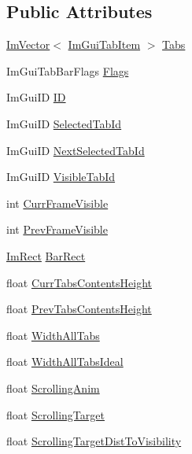 \subsection*{Public Attributes}
\begin{DoxyCompactItemize}
\item 
\hyperlink{structImVector}{Im\+Vector}$<$ \hyperlink{structImGuiTabItem}{Im\+Gui\+Tab\+Item} $>$ \hyperlink{structImGuiTabBar_a4d6d0ae42c1189fcdcec50c1e1e9b057}{Tabs}
\item 
Im\+Gui\+Tab\+Bar\+Flags \hyperlink{structImGuiTabBar_aa528c4c6a2b733caf8f4d83828077d87}{Flags}
\item 
Im\+Gui\+ID \hyperlink{structImGuiTabBar_a05b16eabc366d306e18d433ae9a741cc}{ID}
\item 
Im\+Gui\+ID \hyperlink{structImGuiTabBar_a42fa6a88e4533103420edf6095d6c2aa}{Selected\+Tab\+Id}
\item 
Im\+Gui\+ID \hyperlink{structImGuiTabBar_aba7b1f0157f85df2acc09bc107d6dfa0}{Next\+Selected\+Tab\+Id}
\item 
Im\+Gui\+ID \hyperlink{structImGuiTabBar_a1716495ecb746feb37f0b736edb50c89}{Visible\+Tab\+Id}
\item 
int \hyperlink{structImGuiTabBar_a78e5cbb7a8a793e964397f85fca07432}{Curr\+Frame\+Visible}
\item 
int \hyperlink{structImGuiTabBar_ac95b0b476d7545e74adc6a6472dc1f14}{Prev\+Frame\+Visible}
\item 
\hyperlink{structImRect}{Im\+Rect} \hyperlink{structImGuiTabBar_a6cfe603b0077e3ae0dfeec093acce320}{Bar\+Rect}
\item 
float \hyperlink{structImGuiTabBar_ab95ee8e47a23b1a837d8db6d84bb174f}{Curr\+Tabs\+Contents\+Height}
\item 
float \hyperlink{structImGuiTabBar_a00abffebf4f6b8e025cf1dc910a13674}{Prev\+Tabs\+Contents\+Height}
\item 
float \hyperlink{structImGuiTabBar_a399daf37a3468ef8311a2093a575e263}{Width\+All\+Tabs}
\item 
float \hyperlink{structImGuiTabBar_ad096f5f78c82eed61281b41c6d065f0a}{Width\+All\+Tabs\+Ideal}
\item 
float \hyperlink{structImGuiTabBar_a0f8c0995a150b9f9439e2f02afc3936f}{Scrolling\+Anim}
\item 
float \hyperlink{structImGuiTabBar_a1b7c74460402870d7ba50a798ba66365}{Scrolling\+Target}
\item 
float \hyperlink{structImGuiTabBar_abc96e776c9f9d14b3f1fb6bdb8b5e5ac}{Scrolling\+Target\+Dist\+To\+Visibility}

\end{DoxyCompactItemize}
